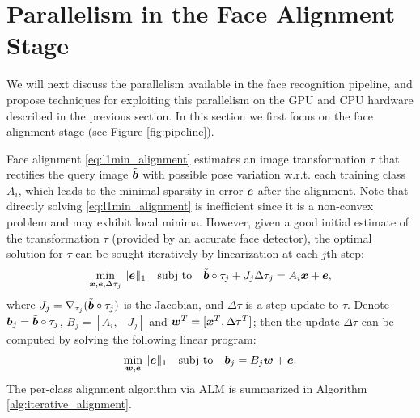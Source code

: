\section{Parallelism in the Face Alignment Stage}
\label{sec:alignment}

We will next discuss the parallelism available in the face recognition
pipeline, and propose techniques for exploiting this parallelism on the GPU and CPU hardware 
described in the previous section.  In this section we first focus on the
face alignment stage (see Figure \ref{fig:pipeline}).

Face alignment \eqref{eq:l1min_alignment} estimates an image transformation
$\tau$ that rectifies the query image $\tilde{\boldsymbol{b}}$ with possible pose
variation w.r.t. each training class $A_i$, which leads to the minimal sparsity
in error $\boldsymbol{e}$ after the alignment. Note that directly solving
\eqref{eq:l1min_alignment} is inefficient since it is a non-convex problem
and may exhibit local minima.
However, given a good initial estimate of the
transformation $\tau$ (\eg provided by an accurate face detector), the optimal
solution for $\tau$ can be sought iteratively by linearization at each $j$th
step:
\begin{equation}
\min_{{\boldsymbol{x}}, \boldsymbol{e}, \Delta \tau_j}\|\boldsymbol{e}\|_1\quad \textup{subj to}\quad \tilde{\boldsymbol{b}}\circ\tau_j +  J_j\Delta \tau_j = A_i{\boldsymbol{x}} + \boldsymbol{e},
\end{equation}
where $J_j = \nabla_{\tau_j}(\tilde{\boldsymbol{b}}\circ\tau_j)$ is the Jacobian, and
$\Delta \tau$ is a step update to $\tau$. Denote $\boldsymbol{b}_j =
\tilde{\boldsymbol{b}}\circ\tau_j$, $B_j = [A_i, -J_j]$ and ${\boldsymbol{w}}^T = [{\boldsymbol{x}}^T, \Delta
\tau^T]$; then the update $\Delta \tau$ can be computed by solving the
following linear program:
\begin{equation}
\min_{{\boldsymbol{w}}, \boldsymbol{e}}\|\boldsymbol{e}\|_1\quad \textup{subj to}\quad \boldsymbol{b}_j = B_j{\boldsymbol{w}} + \boldsymbol{e}.
\label{eq:alignment-linearization}
\end{equation}
The per-class alignment algorithm via ALM is summarized in Algorithm
\ref{alg:iterative_alignment}. 
